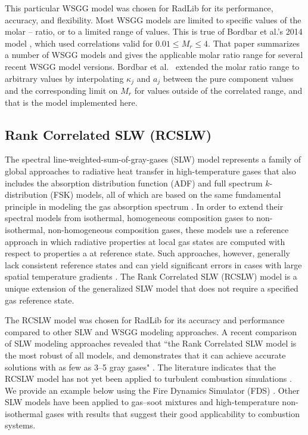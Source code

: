 \documentclass[preprint,12pt]{elsarticle}
\begin{document}
This particular WSGG model was chosen for RadLib for its performance, accuracy, and flexibility. Most WSGG models are limited to specific values of the molar -- ratio, or to a limited range of values. This is true of Bordbar et al.'s 2014 model \cite{Bordbar_2014}, which used correlations valid for $0.01\le M_r\le4$. That paper summarizes a number of WSGG models and gives the applicable molar ratio range for several recent WSGG model versions.
Bordbar et al.~\citep{Bordbar_2020} extended the molar ratio range to arbitrary values by interpolating $\kappa_j$ and $a_j$ between the pure component values and the corresponding limit on $M_r$ for values outside of the correlated range, and that is the model implemented here. 


\subsection{Rank Correlated SLW (RCSLW)} \label{s:RCSLW}

The spectral line-weighted-sum-of-gray-gases (SLW) model represents a family of global approaches to radiative heat transfer in high-temperature gases that also includes the absorption distribution function (ADF) and full spectrum $k$-distribution (FSK) models, all of which are based on the same fundamental principle in modeling the gas absorption spectrum \cite{Solovjov_2016}. In order to extend their spectral models from isothermal, homogeneous composition gases to non-isothermal, non-homogeneous composition gases, these models use a reference approach in which radiative properties at local gas states are computed with respect to properties a at reference state. Such approaches, however, generally lack consistent reference states and can yield significant errors in cases with large spatial temperature gradients \cite{Solovjov_2017}. The Rank Correlated SLW (RCSLW) model is a unique extension of the generalized SLW model that does not require a specified gas reference state.

The RCSLW model was chosen for RadLib for its accuracy and performance compared to other SLW and WSGG modeling approaches. A recent comparison of SLW modeling approaches revealed that ``the Rank Correlated SLW model is the most robust of all models, and demonstrates that it can achieve accurate solutions with as few as 3–5 gray gases" \citep{Badger_2019}. The literature indicates that the RCSLW model has not yet been applied to turbulent combustion simulations \cite{Modest_2016,Coelho_2017}. We provide an example below using the Fire Dynamics Simulator (FDS) \cite{FDS}. 
Other SLW models have been applied to gas--soot mixtures \cite{Solovjov_2001,Solovjov_2001b} and high-temperature non-isothermal gases \cite{Solovjov_2011,Solovjov_2020} with results that suggest their good applicability to combustion systems. 
\end{document}
